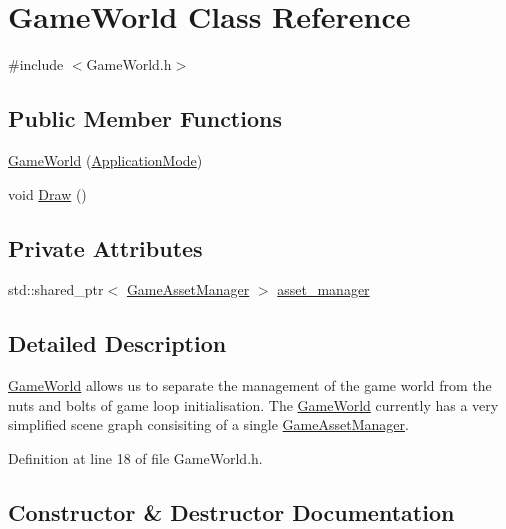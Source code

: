 \hypertarget{class_game_world}{}\section{Game\+World Class Reference}
\label{class_game_world}


{\ttfamily \#include $<$Game\+World.\+h$>$}

\subsection*{Public Member Functions}
\begin{DoxyCompactItemize}
\item 
\hyperlink{class_game_world_a17a84e57a80600961088afc753036f89}{Game\+World} (\hyperlink{common_8h_add86e7c88dd109abea3f708b422f31f0}{Application\+Mode})
\item 
void \hyperlink{class_game_world_a275418607d8286979b276f165ad5876b}{Draw} ()
\end{DoxyCompactItemize}
\subsection*{Private Attributes}
\begin{DoxyCompactItemize}
\item 
std\+::shared\+\_\+ptr$<$ \hyperlink{class_game_asset_manager}{Game\+Asset\+Manager} $>$ \hyperlink{class_game_world_aec5c0bca4fb5a41e4aac2dce2871266d}{asset\+\_\+manager}
\end{DoxyCompactItemize}


\subsection{Detailed Description}
\hyperlink{class_game_world}{Game\+World} allows us to separate the management of the game world from the nuts and bolts of game loop initialisation. The \hyperlink{class_game_world}{Game\+World} currently has a very simplified scene graph consisiting of a single \hyperlink{class_game_asset_manager}{Game\+Asset\+Manager}. 

Definition at line 18 of file Game\+World.\+h.



\subsection{Constructor \& Destructor Documentation}
\hypertarget{class_game_world_a17a84e57a80600961088afc753036f89}{}
